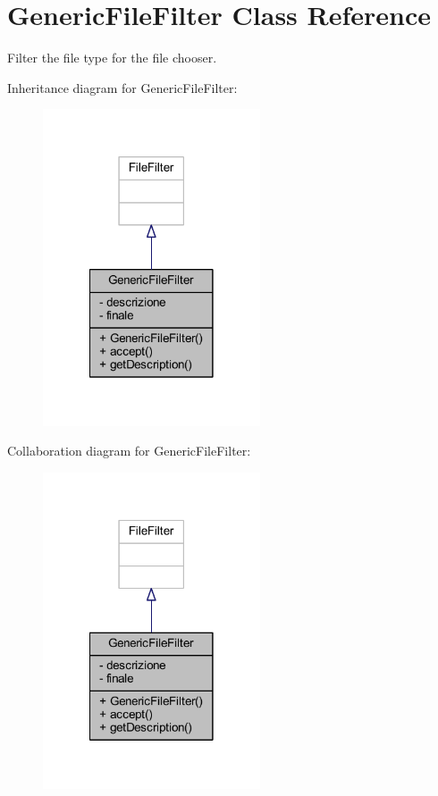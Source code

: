 \hypertarget{class_generic_file_filter}{\section{Generic\-File\-Filter Class Reference}
\label{class_generic_file_filter}
}


Filter the file type for the file chooser.  




Inheritance diagram for Generic\-File\-Filter\-:\nopagebreak
\begin{figure}[H]
\begin{center}
\leavevmode
\includegraphics[width=182pt]{class_generic_file_filter__inherit__graph}
\end{center}
\end{figure}


Collaboration diagram for Generic\-File\-Filter\-:\nopagebreak
\begin{figure}[H]
\begin{center}
\leavevmode
\includegraphics[width=182pt]{class_generic_file_filter__coll__graph}
\end{center}
\end{figure}
